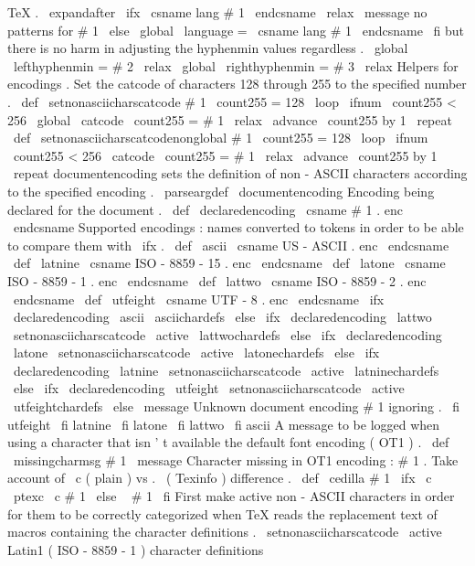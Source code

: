 {{{{{TeX
.
\
expandafter
\
ifx
\
csname
lang
#
1
\
endcsname
\
relax
\
message
{
no
patterns
for
#
1
}
%
\
else
\
global
\
language
=
\
csname
lang
#
1
\
endcsname
\
fi
%
but
there
is
no
harm
in
adjusting
the
hyphenmin
values
regardless
.
\
global
\
lefthyphenmin
=
#
2
\
relax
\
global
\
righthyphenmin
=
#
3
\
relax
}
%
Helpers
for
encodings
.
%
Set
the
catcode
of
characters
128
through
255
to
the
specified
number
.
%
\
def
\
setnonasciicharscatcode
#
1
{
%
\
count255
=
128
\
loop
\
ifnum
\
count255
<
256
\
global
\
catcode
\
count255
=
#
1
\
relax
\
advance
\
count255
by
1
\
repeat
}
\
def
\
setnonasciicharscatcodenonglobal
#
1
{
%
\
count255
=
128
\
loop
\
ifnum
\
count255
<
256
\
catcode
\
count255
=
#
1
\
relax
\
advance
\
count255
by
1
\
repeat
}
%
documentencoding
sets
the
definition
of
non
-
ASCII
characters
%
according
to
the
specified
encoding
.
%
\
parseargdef
\
documentencoding
{
%
%
Encoding
being
declared
for
the
document
.
\
def
\
declaredencoding
{
\
csname
#
1
.
enc
\
endcsname
}
%
%
%
Supported
encodings
:
names
converted
to
tokens
in
order
to
be
able
%
to
compare
them
with
\
ifx
.
\
def
\
ascii
{
\
csname
US
-
ASCII
.
enc
\
endcsname
}
%
\
def
\
latnine
{
\
csname
ISO
-
8859
-
15
.
enc
\
endcsname
}
%
\
def
\
latone
{
\
csname
ISO
-
8859
-
1
.
enc
\
endcsname
}
%
\
def
\
lattwo
{
\
csname
ISO
-
8859
-
2
.
enc
\
endcsname
}
%
\
def
\
utfeight
{
\
csname
UTF
-
8
.
enc
\
endcsname
}
%
%
\
ifx
\
declaredencoding
\
ascii
\
asciichardefs
%
\
else
\
ifx
\
declaredencoding
\
lattwo
\
setnonasciicharscatcode
\
active
\
lattwochardefs
%
\
else
\
ifx
\
declaredencoding
\
latone
\
setnonasciicharscatcode
\
active
\
latonechardefs
%
\
else
\
ifx
\
declaredencoding
\
latnine
\
setnonasciicharscatcode
\
active
\
latninechardefs
%
\
else
\
ifx
\
declaredencoding
\
utfeight
\
setnonasciicharscatcode
\
active
\
utfeightchardefs
%
\
else
\
message
{
Unknown
document
encoding
#
1
ignoring
.
}
%
%
\
fi
%
utfeight
\
fi
%
latnine
\
fi
%
latone
\
fi
%
lattwo
\
fi
%
ascii
}
%
A
message
to
be
logged
when
using
a
character
that
isn
'
t
available
%
the
default
font
encoding
(
OT1
)
.
%
\
def
\
missingcharmsg
#
1
{
\
message
{
Character
missing
in
OT1
encoding
:
#
1
.
}
}
%
Take
account
of
\
c
(
plain
)
vs
.
\
(
Texinfo
)
difference
.
\
def
\
cedilla
#
1
{
\
ifx
\
c
\
ptexc
\
c
{
#
1
}
\
else
\
{
#
1
}
\
fi
}
%
First
make
active
non
-
ASCII
characters
in
order
for
them
to
be
%
correctly
categorized
when
TeX
reads
the
replacement
text
of
%
macros
containing
the
character
definitions
.
\
setnonasciicharscatcode
\
active
%
%
Latin1
(
ISO
-
8859
-
1
)
character
definitions
}}}}
